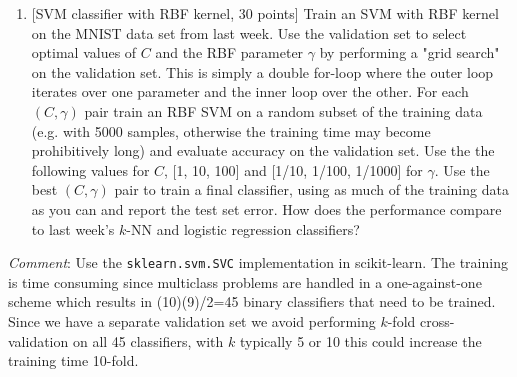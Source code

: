 \documentclass[11pt]{article}
\providecommand{\tightlist}{%
      \setlength{\itemsep}{0pt}\setlength{\parskip}{0pt}}
\begin{document}
    \begin{enumerate}
\def\labelenumi{\arabic{enumi})}
\setcounter{enumi}{2}
\tightlist
\item
  {[}SVM classifier with RBF kernel, 30 points{]} Train an SVM with RBF
  kernel on the MNIST data set from last week. Use the validation set to
  select optimal values of \(C\) and the RBF parameter \(\gamma\) by
  performing a "grid search" on the validation set. This is simply a
  double for-loop where the outer loop iterates over one parameter and
  the inner loop over the other. For each \((C,\gamma)\) pair train an
  RBF SVM on a random subset of the training data (e.g. with 5000
  samples, otherwise the training time may become prohibitively long)
  and evaluate accuracy on the validation set. Use the the following
  values for \(C\), {[}1, 10, 100{]} and {[}1/10, 1/100, 1/1000{]} for
  \(\gamma\). Use the best \((C,\gamma)\) pair to train a final
  classifier, using as much of the training data as you can and report
  the test set error. How does the performance compare to last week's
  \(k\)-NN and logistic regression classifiers?
\end{enumerate}

\emph{Comment}: Use the \texttt{sklearn.svm.SVC} implementation in
scikit-learn. The training is time consuming since multiclass problems
are handled in a one-against-one scheme which results in (10)(9)/2=45
binary classifiers that need to be trained. Since we have a separate
validation set we avoid performing \(k\)-fold cross-validation on all 45
classifiers, with \(k\) typically 5 or 10 this could increase the
training time 10-fold.
\end{document}
